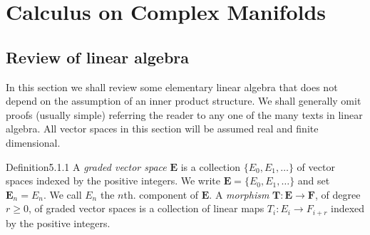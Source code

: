 \chapter{Calculus on Complex Manifolds}\label{ch:5}
\ChapterFiveIntroduction
\section{Review of linear algebra}\label{sec:5:1}
In this section we shall review some elementary linear algebra that does not depend on the assumption of an inner product structure. We shall generally omit proofs (usually simple) referring the reader to any one of the many texts in linear algebra. All vector spaces in this section will be assumed real and finite dimensional.

\begin{originaltheorem}{Definition}{5.1.1}
A \emph{graded vector space} $\mathbf E$ is a collection $\{E_0,E_1,\ldots\}$ of vector spaces indexed by the positive integers. We write $\mathbf E=\{E_0,E_1,\ldots\}$ and set $\mathbf E_n=E_n$. We call $E_n$ the $n$th. component of $\mathbf E$. A \emph{morphism} $\mathbf T:\mathbf E\longrightarrow\mathbf F$, of degree $r\geq0$, of graded vector spaces is a collection of linear maps $T_i:E_i\to F_{i+r}$ indexed by the positive integers.
\end{originaltheorem}
